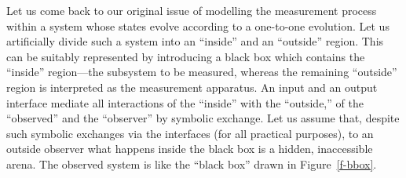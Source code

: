 Let us come back to our original issue of modelling the measurement
process within a system whose states evolve according  to a one-to-one
evolution.
Let us artificially divide such a system into an ``inside'' and an
``outside'' region.
This can be suitably represented by introducing a black box which
contains the ``inside'' region---the subsystem to be measured, whereas
the
remaining ``outside'' region is interpreted as the measurement
apparatus.
An input and an output interface mediate all interactions of the
``inside'' with the ``outside,'' of the ``observed'' and the
``observer'' by symbolic exchange. Let us assume that, despite such
symbolic exchanges via the interfaces
(for all practical purposes),
to an outside
observer
 what happens inside the black box is a hidden,
 inaccessible
  arena.
The observed system is like the ``black box'' drawn in
Figure~\ref{f-bbox}.
